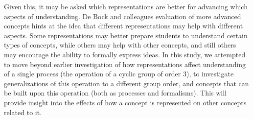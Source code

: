 \documentclass[11pt]{article}
\begin{document}
Given this, it may be asked which representations are better for advancing which aspects of understanding. De Bock and colleagues evaluation of more advanced concepts hints at the idea that different representations may help with different aspects. Some representations may better prepare students to understand certain types of concepts, while others may help with other concepts, and still others may encourage the ability to formally express ideas. In this study, we attempted to move beyond earlier investigation of how representations affect understanding of a single process (the operation of a cyclic group of order 3), to investigate generalizations of this operation to a different group order, and concepts that can be built upon this operation (both as processes and formalisms). This will provide insight into the effects of how a concept is represented on other concepts related to it. 
\end{document}
